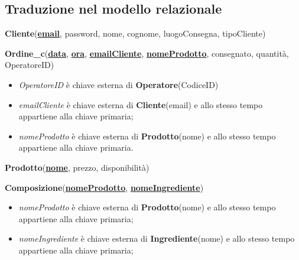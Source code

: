 \documentclass[12pt,a4paper]{article}
\begin{document}
    \newpage
    \subsection{Traduzione nel modello relazionale}
    \begin{tcolorbox}[
        colback=gray!8,
        colframe=black!30,
        title=
    ]
        \textbf{Cliente}(\textbf{\uline{email}}, password, nome, cognome, luogoConsegna, tipoCliente)
    \end{tcolorbox}

    \begin{tcolorbox}[
        colback=gray!8,
        colframe=black!30,
        title=
    ]
        \textbf{Ordine\_c}(\uline{\textbf{data}}, \textbf{\uline{ora}}, \textbf{\uline{emailCliente}}, \textbf{\uline{nomeProdotto}}, consegnato, quantità, OperatoreID)
        \begin{itemize}[leftmargin=1em]
            \item \textit{OperatoreID} è chiave esterna di \textbf{Operatore}(CodiceID)
            \item \textit{emailCliente} è chiave esterna di \textbf{Cliente}(email) e allo stesso tempo appartiene alla chiave primaria;
            \item \textit{nomeProdotto} è chiave esterna di \textbf{Prodotto}(nome) e allo stesso tempo appartiene alla chiave primaria.
        \end{itemize}
    \end{tcolorbox}
    
    \begin{tcolorbox}[
        colback=gray!8,
        colframe=black!30,
        title=
    ]
        \textbf{Prodotto}(\textbf{\uline{nome}}, prezzo, disponibilità)
    \end{tcolorbox}

    \begin{tcolorbox}[
        colback=gray!8,
        colframe=black!30,
        title=
    ]
        \textbf{Composizione}(\textbf{\uline{nomeProdotto}}, \textbf{\uline{nomeIngrediente}})
        \begin{itemize}[leftmargin=1em]
            \item \textit{nomeProdotto} è chiave esterna di \textbf{Prodotto}(nome) e allo stesso tempo appartiene alla chiave primaria;
            \item \textit{nomeIngrediente} è chiave esterna di \textbf{Ingrediente}(nome) e allo stesso tempo appartiene alla chiave primaria;
        \end{itemize}
    \end{tcolorbox}
\end{document}
